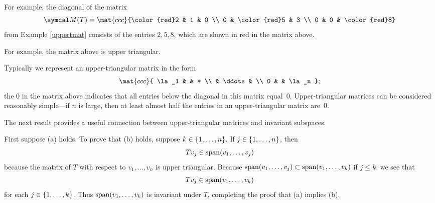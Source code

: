 
For example, the diagonal of the matrix
\[
\M(T) = \mat{ccc}{\color{red}2 & 1 & 0 \\
0 & \color{red}5 & 3 \\
0 & 0 & \color{red}8}
\]
from Example \ref{uppertmat} consists of the entries $2, 5, 8$, which are shown in red in the matrix above.


For example, the  matrix above is upper triangular.

Typically we represent an
upper-triangular matrix in the form
\[
\mat{ccc}{
\la_1 & & * \\
& \ddots & \\
0 & & \la_n };
\]
the $0$ in the matrix above indicates that all entries below the diagonal in this
 matrix equal~$0$.  Upper-triangular matrices can be considered
reasonably simple---if $n$ is large, then at least almost half the entries in an  upper-triangular matrix are~$0$.

The next result provides a useful connection between upper-triangular matrices and invariant subspaces.


\proof
First suppose (a) holds. To prove that (b) holds, suppose $k \in \{1, \ldots, n\}$. If $j \in \{1, \ldots, n\}$, then
\[
Tv_j \in \operatorname{span} (v_1, \ldots, v_j)
\]
because the matrix of $T$ with respect to $v_1, \dots, v_n$ is upper triangular. Because
$\operatorname{span}(v_1, \ldots, v_j) \subset \operatorname{span}(v_1, \ldots, v_k)$ if $j \le k$, we see that
\[
Tv_j \in \operatorname{span}(v_1, \ldots, v_k)
\]
for each $j \in \{1, \ldots, k\}$. Thus $\operatorname{span}(v_1, \dots, v_k)$ is invariant under $T$, completing the proof that (a) implies (b).

